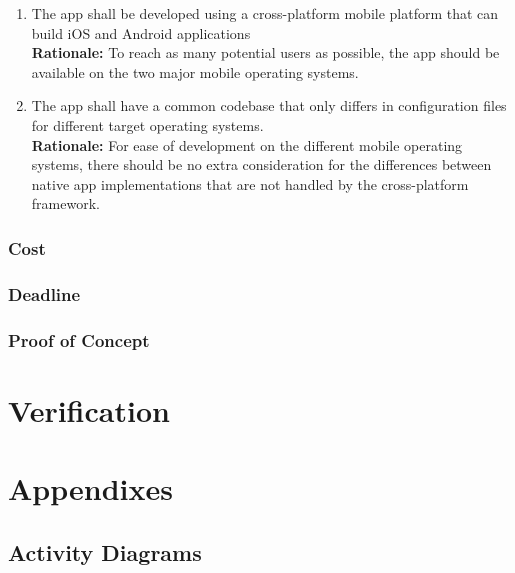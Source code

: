 \documentclass{article}
\begin{document}
\begin{enumerate}[align=left, label=\textbf{DI-P\arabic*.}]
    \item The app shall be developed using a cross-platform mobile platform that can build iOS and Android applications\\
          {\bf Rationale:} To reach as many potential users as possible, the app should be available on the two major mobile operating systems.
    \item The app shall have a common codebase that only differs in configuration files for different target operating systems.\\
          {\bf Rationale:} For ease of development on the different mobile operating systems, there should be no extra consideration for the differences between native app implementations that are not handled by the cross-platform framework.
\end{enumerate}

\subsubsection{Cost}


\subsubsection{Deadline}


\subsubsection{Proof of Concept}

\section{Verification}


\section{Appendixes}

\subsection{Activity Diagrams}
\label{sub:activity_diagrams}
\end{document}
